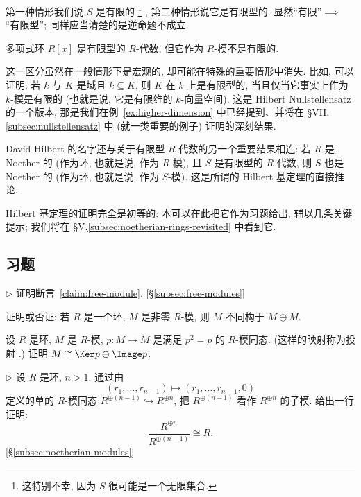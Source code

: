 第一种情形我们说 $S$ 是有限的%
\footnote{这特别不幸, 因为 $S$ 很可能是一个无限集合.}%
, 第二种情形说它是有限型的. 显然``有限''$\implies$``有限型''; 同样应当清楚的是逆命题不成立.

\begin{example}
\label{ex:Rx-finite-type}
多项式环 $R[x]$ 是有限型的 $R$-代数, 但它作为 $R$-模不是有限的.
\end{example}

这一区分虽然在一般情形下是宏观的, 却可能在特殊的重要情形中消失. 比如, 可以证明: 若 $k$ 与 $K$ 是域且 $k \subseteq K$, 则 $K$ 在 $k$ 上是有限型的, 当且仅当它事实上作为 $k$-模是有限的 (也就是说, 它是有限维的 $k$-向量空间). 这是 Hilbert Nullstellensatz 的一个版本, 那是我们在例~\ref{ex:higher-dimension} 中已经提到、并将在 \S VII.\ref{subsec:nullstellensatz} 中 (就一类重要的例子) 证明的深刻结果.

David Hilbert 的名字还与关于有限型 $R$-代数的另一个重要结果相连: 若 $R$ 是 Noether 的 (作为环, 也就是说, 作为 $R$-模), 且 $S$ 是有限型的 $R$-代数, 则 $S$ 也是 Noether 的 (作为环, 也就是说, 作为 $S$-模). 这是所谓的 Hilbert 基定理的直接推论.

Hilbert 基定理的证明完全是初等的: 本可以在此把它作为习题给出, 辅以几条关键提示; 我们将在 \S V.\ref{subsec:noetherian-rings-revisited} 中看到它.

\subsection*{习题}
{}

\begin{prob}
\label{ex:free-module-proof}
$\triangleright$ 证明断言~\ref{claim:free-module}. [\S\ref{subsec:free-modules}]
\end{prob}

\begin{prob}
\label{ex:M-not-MM}
证明或否证: 若 $R$ 是一个环, $M$ 是非零 $R$-模, 则 $M$ 不同构于 $M \oplus M$.
\end{prob}

\begin{prob}
\label{ex:projection}
设 $R$ 是环, $M$ 是 $R$-模, $p : M \to M$ 是满足 $p^2 = p$ 的 $R$-模同态. (这样的映射称为投射%
.) 证明 $M \cong \Ker p \oplus \Image p$.
\end{prob}

\begin{prob}
\label{ex:rn-quotient}
$\triangleright$ 设 $R$ 是环, $n > 1$. 通过由
\[
(r_1, \dots, r_{n-1}) \mapsto (r_1, \dots, r_{n-1}, 0)
\]
定义的单的 $R$-模同态 $R^{\oplus(n-1)} \hookrightarrow R^{\oplus n}$, 把 $R^{\oplus(n-1)}$ 看作 $R^{\oplus n}$ 的子模. 给出一行证明:
\[
\frac{R^{\oplus n}}{R^{\oplus(n-1)}} \cong R.
\]
[\S\ref{subsec:noetherian-modules}]
\end{prob}


